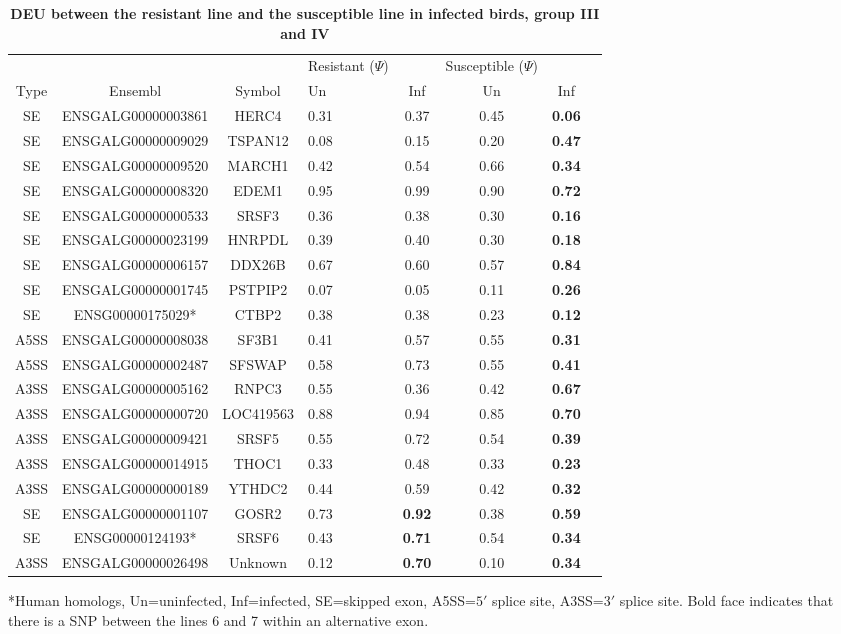\begin{landscape}
\begin{table}[!ht]
\caption{
\textbf{DEU between the resistant line and the susceptible line
in infected birds, group III and IV}}
\begin{center}
\begin{tabular}{cccp{2cm}cccc}
\hline
& & & Resistant ($\Psi$) & & Susceptible ($\Psi$) & \\
Type & Ensembl & Symbol  & Un & Inf & Un & Inf \\
\hline
SE & ENSGALG00000003861 & HERC4 & 0.31 & 0.37 & 0.45 & \textbf{0.06} \\
SE & ENSGALG00000009029 & TSPAN12 & 0.08 & 0.15 & 0.20 & \textbf{0.47} \\
SE & ENSGALG00000009520 & MARCH1 & 0.42 & 0.54 & 0.66 & \textbf{0.34} \\
SE & ENSGALG00000008320 & EDEM1 & 0.95 & 0.99 & 0.90 & \textbf{0.72} \\
SE & ENSGALG00000000533 & SRSF3 & 0.36 & 0.38 & 0.30 & \textbf{0.16} \\
SE & ENSGALG00000023199 & HNRPDL & 0.39 & 0.40 & 0.30 & \textbf{0.18} \\
SE & ENSGALG00000006157 & DDX26B & 0.67 & 0.60 & 0.57 & \textbf{0.84} \\
SE & ENSGALG00000001745 & PSTPIP2 & 0.07 & 0.05 & 0.11 & \textbf{0.26} \\
SE & ENSG00000175029* & CTBP2 & 0.38 & 0.38 & 0.23 & \textbf{0.12} \\
A5SS & ENSGALG00000008038 & SF3B1 & 0.41 & 0.57 & 0.55 & \textbf{0.31} \\
A5SS & ENSGALG00000002487 & SFSWAP & 0.58 & 0.73 & 0.55 &
\textbf{0.41} \\
A3SS & ENSGALG00000005162 & RNPC3 & 0.55 & 0.36 & 0.42 & \textbf{0.67} \\
A3SS & ENSGALG00000000720 & LOC419563 & 0.88 & 0.94 & 0.85 &
\textbf{0.70} \\
A3SS & ENSGALG00000009421 & SRSF5 & 0.55 & 0.72 & 0.54 & \textbf{0.39} \\
A3SS & ENSGALG00000014915 & THOC1 & 0.33 & 0.48 & 0.33 & \textbf{0.23} \\
A3SS & ENSGALG00000000189 & YTHDC2 & 0.44 & 0.59 & 0.42 &
\textbf{0.32} \\
\hline
SE & ENSGALG00000001107 & GOSR2 & 0.73 & \textbf{0.92} & 0.38 &
\textbf{0.59} \\
SE & ENSG00000124193* & SRSF6 & 0.43 & \textbf{0.71} & 0.54 &
\textbf{0.34} \\
A3SS & ENSGALG00000026498 & Unknown & 0.12 & \textbf{0.70} & 0.10 &
\textbf{0.34} \\
\hline
\end{tabular}
\begin{flushleft}
    *Human homologs, Un=uninfected, Inf=infected, SE=skipped exon,
    A5SS=$5\prime$ splice site, A3SS=$3\prime$ splice site.  Bold face
    indicates that there is a SNP between the lines 6 and 7
    within an alternative exon.
\end{flushleft}
\label{tab:line67i_diff_line67u_three}
\end{center}
\end{table}
\end{landscape}
\pagestyle{plain}

